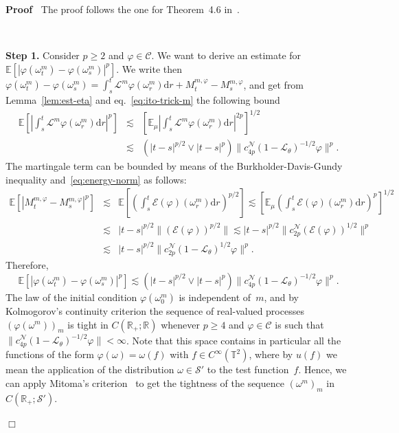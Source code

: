 \documentclass{article}
\newcommand{\mathd}{\mathrm{d}}
\newcommand{\tmtextbf}[1]{{\bfseries{#1}}}
\newenvironment{proof}{\noindent\textbf{Proof\ }}{\hspace*{\fill}$\Box$\medskip}
\begin{document}
\begin{proof}
  The proof follows the one for Theorem~4.6
  in~{\cite{gubinelli2018infinitesimal}}.
  
  \
  
  \tmtextbf{Step 1.} Consider $p \geqslant 2$ and $\varphi \in \mathcal{C}$.
  We want to derive an estimate for $\mathbb{E} [| \varphi (\omega^m_t) -
  \varphi (\omega_s^m) |^p]$. We write then $\varphi (\omega^m_t) - \varphi
  (\omega_s^m) = \int_s^t \mathcal{L}^m \varphi (\omega^m_r) \mathd r +
  M_t^{m, \varphi} - M_s^{m, \varphi}$, and get from Lemma~\ref{lem:est-eta}
  and eq.~{\eqref{eq:ito-trick-m}} the following bound
  \[ \begin{array}{lll}
       \mathbb{E} \left[ \left| \int_s^t \mathcal{L}^m \varphi (\omega^m_r)
       \mathd r \right|^p \right] & \lesssim & \left[ \mathbb{E}_{\mu} \left|
       \int_s^t \mathcal{L}^m \varphi (\omega_r^m) \mathd r \right|^{2 p}
       \right]^{1 / 2}\\
       & \lesssim & (| t - s |^{p / 2} \vee | t - s |^p) \| c_{4
       p}^{\mathcal{N}} (1 -\mathcal{L}_{\theta})^{- 1 / 2} \varphi \|^p .
     \end{array} \]
  The martingale term can be bounded by means of the Burkholder-Davis-Gundy
  inequality and~{\eqref{eq:energy-norm}} as follows:
  \[ \begin{array}{lll}
       \mathbb{E} [| M_t^{m, \varphi} - M_s^{m, \varphi} |^p] & \lesssim &
       \mathbb{E} \left[ \left( \int_s^t \mathcal{E} (\varphi) (\omega^m_r)
       \mathd r \right)^{p / 2} \right] \lesssim \left[ \mathbb{E}_{\mu}
       \left( \int_s^t \mathcal{E} (\varphi) (\omega_r^m) \mathd r \right)^p
       \right]^{1 / 2}\\
       & \lesssim & | t - s |^{p / 2} \| (\mathcal{E} (\varphi))^{p / 2} \|
       \lesssim | t - s |^{p / 2} \| c_{2 p}^{\mathcal{N}} (\mathcal{E}
       (\varphi))^{1 / 2} \|^p\\
       & \lesssim & | t - s |^{p / 2} \| c_{2 p}^{\mathcal{N}} (1
       -\mathcal{L}_{\theta})^{1 / 2} \varphi \|^p .
     \end{array} \]
  Therefore,
  \[ \mathbb{E} [| \varphi (\omega_t^m) - \varphi (\omega_s^m) |^p] \lesssim
     (| t - s |^{p / 2} \vee | t - s |^p) \| c_{4 p}^{\mathcal{N}} (1
     -\mathcal{L}_{\theta})^{- 1 / 2} \varphi \|^p . \]
  The law of the initial condition $\varphi (\omega_0^m)$ is independent
  of~$m$, and by Kolmogorov's continuity criterion the sequence of real-valued
  processes $(\varphi (\omega^m))_m$ is tight in $C (\mathbb{R}_+ ;
  \mathbb{R})$ whenever $p \geqslant 4$ and $\varphi \in \mathcal{C}$ is such
  that $\| c_{4 p}^{\mathcal{N}} (1 -\mathcal{L}_{\theta})^{- 1 / 2} \varphi
  \| < \infty$. Note that this space contains in particular all the functions
  of the form $\varphi (\omega) = \omega (f)$ with $f \in C^{\infty}
  (\mathbb{T}^2)$, where by $u (f)$ we mean the application of the
  distribution $\omega \in \mathcal{S}'$ to the test function~$f$. Hence, we
  can apply Mitoma's criterion~{\cite{Mitoma1983}} to get the tightness of the
  sequence $(\omega^m)_m$ in $C (\mathbb{R}_+ ; \mathcal{S}')$.
  

\end{proof}
\end{document}
